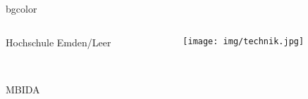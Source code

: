 %
%
%
%


\usepackage[utf8]{inputenc} %
\usepackage[german]{babel}
\usepackage{amsmath}
\usepackage{amsfonts}
\usepackage{amssymb}
\usepackage{colortbl}
\usepackage{cancel} %

\usepackage{pgfpages} 

\usepackage{tikz}
\usepackage{gnuplottex}
\usepackage{pgf}
\usepackage{colortbl} 
\usetikzlibrary{calc}
\usetikzlibrary{shapes,arrows} %
\usetikzlibrary{shapes.geometric} %
\usepackage{scalefnt}
\usetikzlibrary{decorations.markings} %
\usetikzlibrary{calc,patterns,decorations.pathmorphing,decorations.markings}
\usepackage{url}

\usepackage[
  backend=biber,
  style=alphabetic,
  sorting=ynt
]{biblatex}

{%
\begin{beamercolorbox}[rounded=true, center]{bgcolor}
\begin{columns}[T]
\begin{column}{9cm}
{\color{gray}\begin{tiny}Hochschule Emden/Leer\end{tiny}} \\ 
{\color{gray}\begin{tiny}MBIDA\end{tiny}} \\ 
\end{column}
\begin{column}{2cm}
\texttt{[image: img/technik.jpg]}
\end{column}
\end{columns}
\end{beamercolorbox}
 }
\insertsectionhead
\insertsubsectionhead
{}
\usebackgroundtemplate
{%
      \rule{0pt}{\paperheight}%
      \hspace*{\paperwidth}%
 }

